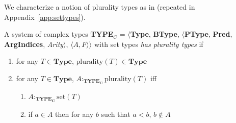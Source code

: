 \begin{shaded}
We characterize a notion of plurality types as in \nexteg{} (repeated
in Appendix~\ref{app:settypes}). 
\begin{ex}
  A system of complex types {\bf TYPE$_C$} = $\langle${\bf Type}, {\bf BType},
$\langle$\textbf{PType}, {\bf Pred}, \textbf{ArgIndices}, {\it
  Arity\/}$\rangle$, $\langle A,F\rangle$$\rangle$ with set types \textit{has plurality types} if
\begin{enumerate} 
 
\item for any $T \in \textbf{Type}$, $\mathrm{plurality}(T) \in \textbf{Type}$ 
 
\item for any $T \in \textbf{Type}$, 
$A:_{\mathbf{TYPE_C}}\mathrm{plurality}(T)$ iff  
\begin{enumerate} 
 
\item $A :_{\mathbf{TYPE_C}} \mathrm{set}(T)$ 
 
\item if $a\in A$ then for any $b$ such that $a<b$, $b\not\in A$ 
 
\end{enumerate} 
  
   
 
\end{enumerate}

 
 
 
 

 
  
 
\label{ex:plurality-types}   
\end{ex}


\end{shaded}
